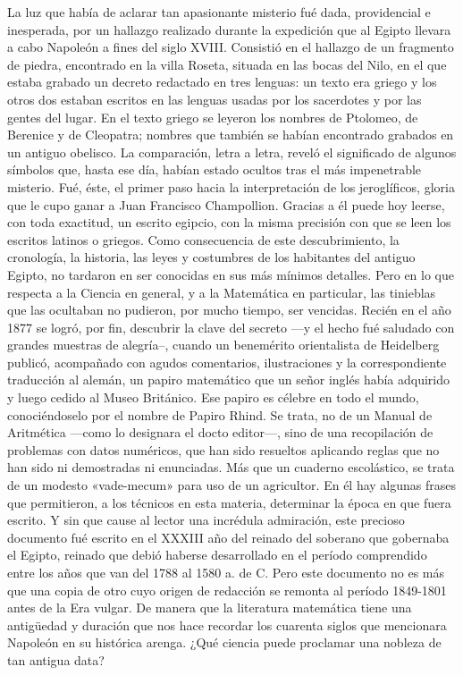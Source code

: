 \documentclass[a4paper, 12pt, draft]{article}
\begin{document}
La luz que había de aclarar tan apasionante misterio fué dada, providencial e inesperada, por un hallazgo realizado durante la expedición que al Egipto llevara a cabo Napoleón a fines del siglo XVIII. Consistió en el hallazgo de un fragmento de piedra, encontrado en la villa Roseta, situada en las bocas del Nilo, en el que estaba grabado un decreto redactado en tres lenguas: un texto era griego y los otros dos estaban escritos en las lenguas usadas por los sacerdotes y por las gentes del lugar. En el texto griego se leyeron los nombres de Ptolomeo, de Berenice y de Cleopatra; nombres que también se habían encontrado grabados en un antiguo obelisco. La comparación, letra a letra, reveló el significado de algunos símbolos que, hasta ese día, habían estado ocultos tras el más impenetrable misterio. Fué, éste, el primer paso hacia la interpretación de los jeroglíficos, gloria que le cupo ganar a Juan Francisco Champollion. Gracias a él puede hoy leerse, con toda exactitud, un escrito egipcio, con la misma precisión con que se leen los escritos latinos o griegos. Como consecuencia de este descubrimiento, la cronología, la historia, las leyes y 
costumbres de los habitantes del antiguo Egipto, no tardaron en ser conocidas en sus más mínimos detalles. Pero en lo que respecta a la Ciencia en general, y a la Matemática en particular, las tinieblas que las ocultaban no pudieron, por mucho tiempo, ser vencidas. Recién en el año 1877 se logró, por fin, descubrir la clave del secreto ---y el hecho fué saludado con grandes muestras de alegría--, cuando un benemérito orientalista de Heidelberg publicó, acompañado con agudos comentarios, ilustraciones y la correspondiente traducción al alemán, un papiro matemático que un señor inglés había adquirido y luego cedido al Museo Británico. Ese papiro
es célebre en todo el mundo, conociéndoselo por el
nombre de Papiro Rhind. Se trata, no de un Manual
de Aritmética ---como lo designara el docto editor---, sino de una recopilación de problemas con datos numéricos, que han sido resueltos aplicando reglas que no han sido ni demostradas ni enunciadas. Más que un cuaderno escolástico, se trata de un modesto «vade-mecum» para uso de un agricultor. En él hay algunas frases que permitieron, a los técnicos en esta materia, determinar la época en que fuera escrito. Y sin que cause al lector una incrédula admiración, este precioso documento fué escrito en el XXXIII año del reinado del soberano que gobernaba el Egipto, reinado que debió haberse desarrollado en el período comprendido entre los años que van del 1788 al 1580 a. de C. Pero este documento no es más que una copia de otro cuyo origen de redacción se remonta al período 1849-1801 antes de la Era vulgar. De manera que la literatura matemática tiene una antigüedad y duración que nos hace recordar los cuarenta siglos que mencionara Napoleón 
en su histórica 
 arenga. ¿Qué ciencia puede proclamar una nobleza de tan antigua data?
\end{document}
